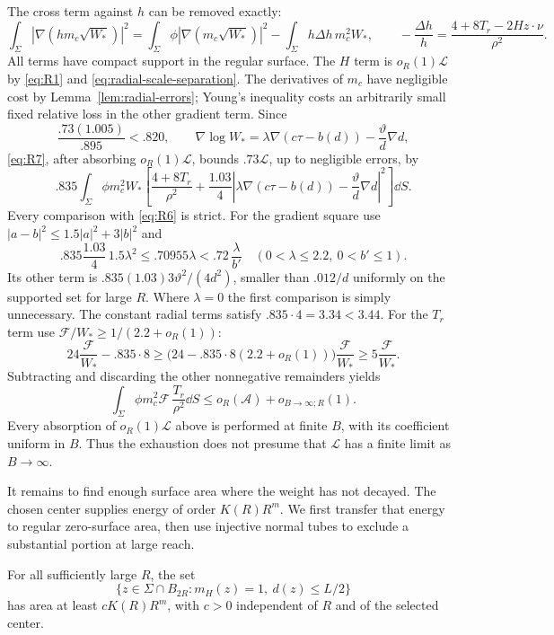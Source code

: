 The cross term against $h$ can be removed exactly:
\[
 \int_\Sigma|\nabla(hm_c\sqrt{W_*})|^2
 =\int_\Sigma\phi|\nabla(m_c\sqrt{W_*})|^2
       -\int_\Sigma h\Delta h\,m_c^2W_* ,
 \qquad
 -\frac{\Delta h}{h}
 =\frac{4+8T_r-2Hz\cdot\nu}{\rho^2}.
\]
All terms have compact support in the regular surface.
The $H$ term is $o_R(1)\mathcal L$ by \eqref{eq:R1} and
\eqref{eq:radial-scale-separation}. The derivatives of $m_c$ have
negligible cost by Lemma~\ref{lem:radial-errors}; Young's inequality
costs an arbitrarily small fixed relative loss in the other
gradient term. Since
\[
 \frac{.73(1.005)}{.895}<.820,\qquad
 \nabla\log W_*=
 \lambda\nabla(c\tau-b(d))-\frac{\vartheta}{d}\nabla d,
\]
\eqref{eq:R7}, after absorbing $o_R(1)\mathcal L$, bounds
$.73\mathcal L$, up to negligible errors, by
\[
 .835\int_\Sigma\phi m_c^2W_*
 \left[
 \frac{4+8T_r}{\rho^2}
 +\frac{1.03}{4}
 \left|\lambda\nabla(c\tau-b(d))
                 -\frac{\vartheta}{d}\nabla d\right|^2
 \right]\dd S .
\]
Every comparison with \eqref{eq:R6} is strict. For the gradient
square use $|a-b|^2\le1.5|a|^2+3|b|^2$ and
\[
 .835\frac{1.03}{4}\,1.5\lambda^2
 \le .70955\lambda<.72\,\frac{\lambda}{b'}
 \quad(0<\lambda\le2.2,\ 0<b'\le1).
\]
Its other term is
$.835(1.03)3\vartheta^2/(4d^2)$, smaller than $.012/d$
uniformly on the supported set for large $R$.
Where $\lambda=0$ the first comparison is simply unnecessary.
The constant radial terms satisfy $.835\cdot4=3.34<3.44$.
For the $T_r$ term use $\mathcal F/W_*\ge1/(2.2+o_R(1))$:
\[
 24\frac{\mathcal F}{W_*}-.835\cdot8
 \ge\bigl(24-.835\cdot8(2.2+o_R(1))\bigr)
                 \frac{\mathcal F}{W_*}
 \ge5\frac{\mathcal F}{W_*}.
\]
Subtracting and discarding the other nonnegative remainders yields
\begin{equation}\label{eq:R8}
 \int_\Sigma\phi m_c^2\mathcal F\,\frac{T_r}{\rho^2}\dd S
 \le o_R(\mathcal A)+o_{B\to\infty;R}(1).
\end{equation}
Every absorption of $o_R(1)\mathcal L$ above is performed at finite
$B$, with its coefficient uniform in $B$. Thus the exhaustion does
not presume that $\mathcal L$ has a finite limit as $B\to\infty$.

It remains to find enough surface area where the weight has not
decayed. The chosen center supplies energy of order $K(R)R^m$.
We first transfer that energy to regular zero-surface area, then use
injective normal tubes to exclude a substantial portion at large reach.

\begin{lemma}\label{lem:radial-area}
For all sufficiently large $R$, the set
\[
 \{z\in\Sigma\cap B_{2R}:m_H(z)=1,\ d(z)\le L/2\}
\]
has area at least $c K(R)R^m$, with $c>0$ independent of $R$ and
of the selected center.
\end{lemma}

